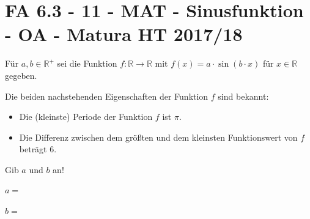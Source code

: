 \section{FA 6.3 - 11 - MAT - Sinusfunktion - OA - Matura HT 2017/18}

\begin{beispiel}[FA 6.3]{1} %
Für $a,b\in\mathbb{R}^+$ sei die Funktion $f: \mathbb{R}\rightarrow\mathbb{R}$ mit $f(x)=a\cdot\sin(b\cdot x)$ für $x\in\mathbb{R}$ gegeben.

Die beiden nachstehenden Eigenschaften der Funktion $f$ sind bekannt:
\begin{itemize}
	\item Die (kleinste) Periode der Funktion $f$ ist $\pi$.
	\item Die Differenz zwischen dem größten und dem kleinsten Funktionswert von $f$ beträgt 6.
\end{itemize}

Gib $a$ und $b$ an!\leer

$a=$\,\leer

$b=$\,
\end{beispiel}